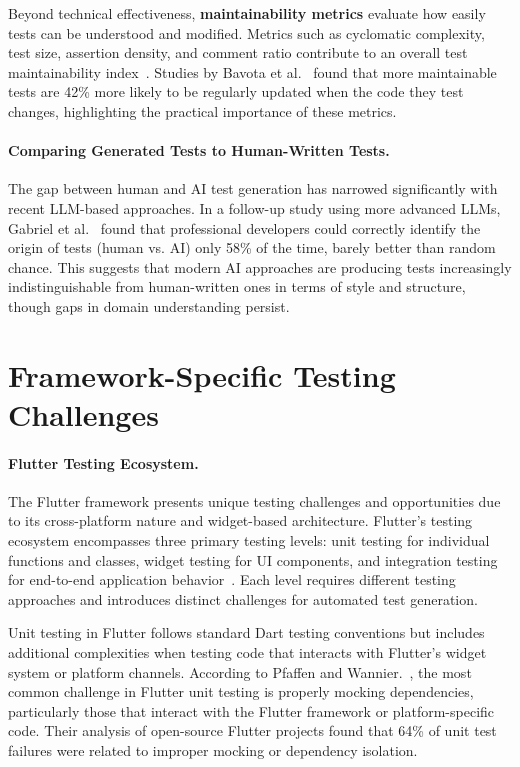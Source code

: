 \hspace{0.5cm} Beyond technical effectiveness, \textbf{maintainability metrics} evaluate how easily tests can be understood and modified. Metrics such as cyclomatic complexity, test size, assertion density, and comment ratio contribute to an overall test maintainability index~\cite{TestMaintainability}. Studies by Bavota et al.~\cite{TestReadability} found that more maintainable tests are 42\% more likely to be regularly updated when the code they test changes, highlighting the practical importance of these metrics.

\paragraph{Comparing Generated Tests to Human-Written Tests.} %

\hspace{0.5cm} The gap between human and AI test generation has narrowed significantly with recent LLM-based approaches. In a follow-up study using more advanced LLMs, Gabriel et al.~\cite{TestBenchmark} found that professional developers could correctly identify the origin of tests (human vs. AI) only 58\% of the time, barely better than random chance. This suggests that modern AI approaches are producing tests increasingly indistinguishable from human-written ones in terms of style and structure, though gaps in domain understanding persist.

\section{Framework-Specific Testing Challenges}

\paragraph{Flutter Testing Ecosystem.} The Flutter framework presents unique testing challenges and opportunities due to its cross-platform nature and widget-based architecture. Flutter's testing ecosystem encompasses three primary testing levels: unit testing for individual functions and classes, widget testing for UI components, and integration testing for end-to-end application behavior~\cite{FlutterTesting}. Each level requires different testing approaches and introduces distinct challenges for automated test generation.

\hspace{0.5cm} Unit testing in Flutter follows standard Dart testing conventions but includes additional complexities when testing code that interacts with Flutter's widget system or platform channels. According to Pfaffen and Wannier.~\cite{FlutterTesting}, the most common challenge in Flutter unit testing is properly mocking dependencies, particularly those that interact with the Flutter framework or platform-specific code. Their analysis of open-source Flutter projects found that 64\% of unit test failures were related to improper mocking or dependency isolation.

